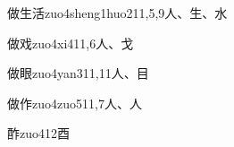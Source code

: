 \begin{EntryWithPhonetic}{做生活}{zuo4sheng1huo2}{11,5,9}{⼈、⽣、⽔}
\end{EntryWithPhonetic}

\begin{EntryWithPhonetic}{做戏}{zuo4xi4}{11,6}{⼈、⼽}
\end{EntryWithPhonetic}

\begin{EntryWithPhonetic}{做眼}{zuo4yan3}{11,11}{⼈、⽬}
\end{EntryWithPhonetic}

\begin{EntryWithPhonetic}{做作}{zuo4zuo5}{11,7}{⼈、⼈}
\end{EntryWithPhonetic}

\begin{EntryWithPhonetic}{酢}{zuo4}{12}{⾣}
\end{EntryWithPhonetic}


